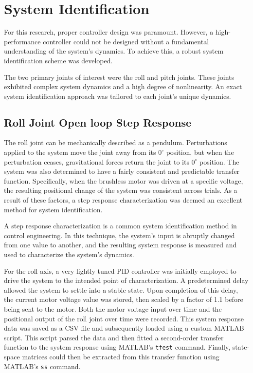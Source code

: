 \section{System Identification}

For this research, proper controller design was paramount. However, a high-performance controller could not be designed without a fundamental understanding of the system's dynamics. To achieve this, a robust system identification scheme was developed.

The two primary joints of interest were the roll and pitch joints. These joints exhibited complex system dynamics and a high degree of nonlinearity. An exact system identification approach was tailored to each joint's unique dynamics.

\subsection{Roll Joint Open loop Step Response}

The roll joint can be mechanically described as a pendulum. Perturbations applied to the system move the joint away from its $0^\circ$ position, but when the perturbation ceases, gravitational forces return the joint to its $0^\circ$ position. The system was also determined to have a fairly consistent and predictable transfer function. Specifically, when the brushless motor was driven at a specific voltage, the resulting positional change of the system was consistent across trials. As a result of these factors, a step response characterization was deemed an excellent method for system identification.

A step response characterization is a common system identification method in control engineering. In this technique, the system's input is abruptly changed from one value to another, and the resulting system response is measured and used to characterize the system's dynamics.

For the roll axis, a very lightly tuned PID controller was initially employed to drive the system to the intended point of characterization. A predetermined delay allowed the system to settle into a stable state. Upon completion of this delay, the current motor voltage value was stored, then scaled by a factor of 1.1 before being sent to the motor. Both the motor voltage input over time and the positional output of the roll joint over time were recorded. This system response data was saved as a CSV file and subsequently loaded using a custom MATLAB script. This script parsed the data and then fitted a second-order transfer function to the system response using MATLAB's \texttt{tfest} command. Finally, state-space matrices could then be extracted from this transfer function using MATLAB's \texttt{ss} command.



